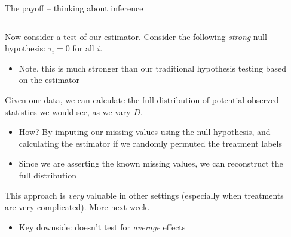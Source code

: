 \documentclass[notes,11pt, aspectratio=169]{beamer}
\newenvironment{wideitemize}{\itemize\addtolength{\itemsep}{10pt}}{\enditemize}
\begin{document}
\begin{frame}{The payoff -- thinking about inference}
\begin{columns}[T] %
  \begin{column}{.7\textwidth}
  \begin{wideitemize}
  \item Now consider a test of our estimator. Consider the following
    \emph{strong} null hypothesis: $\tau_{i} = 0$ for all $i$.
    \begin{itemize}
    \item Note, this is much stronger than our traditional hypothesis
      testing based on the estimator
    \end{itemize}
  \item Given our data, we can calculate the full distribution of
    potential observed statistics we would see, as we vary $D$.
    \begin{itemize}
    \item How? By imputing our missing values using the null
      hypothesis, and calculating the estimator if we randomly permuted the treatment labels
    \item Since we are asserting the known missing values, we can reconstruct the full distribution
    \end{itemize}
  \item This approach is \emph{very} valuable in other settings
    (especially when treatments are very complicated). More next week.
    \begin{itemize}
    \item Key downside: doesn't test for \emph{average} effects
    \end{itemize}
  \end{wideitemize}
  \end{column}%
  \hfill%
  \begin{column}{.4\textwidth}
\end{column}
\end{columns}
\end{frame}
\end{document}
